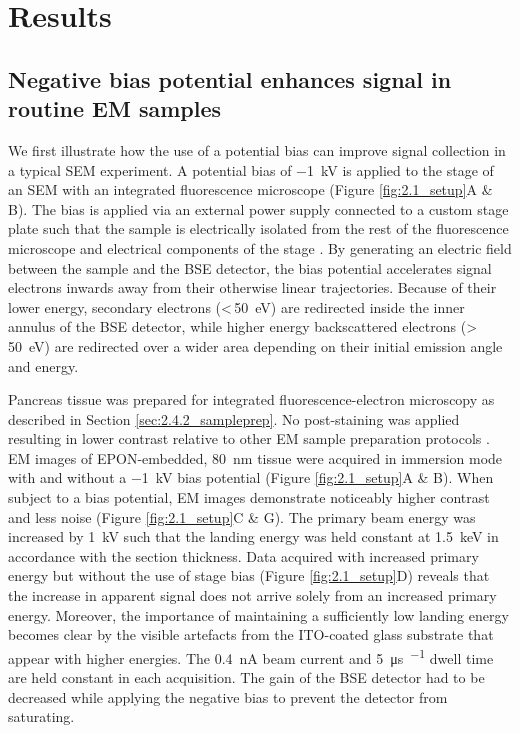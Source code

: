 \section{Results}
\label{sec:2.2_results}

\subsection{Negative bias potential enhances signal in routine EM samples}

We first illustrate how the use of a potential bias can improve signal collection in a typical SEM experiment. A potential bias of \SI{-1}{\kilo\volt} is applied to the stage of an SEM with an integrated fluorescence microscope (Figure \ref{fig:2.1_setup}A \& B). The bias is applied via an external power supply connected to a custom stage plate such that the sample is electrically isolated from the rest of the fluorescence microscope and electrical components of the stage \cite{vos2021retarding}. By generating an electric field between the sample and the BSE detector, the bias potential accelerates signal electrons inwards away from their otherwise linear trajectories. Because of their lower energy, secondary electrons (<\,\SI{50}{\electronvolt}) are redirected inside the inner annulus of the BSE detector, while higher energy backscattered electrons (>\,\SI{50}{\electronvolt}) are redirected over a wider area depending on their initial emission angle and energy.

Pancreas tissue was prepared for integrated fluorescence-electron microscopy as described in Section \ref{sec:2.4.2_sampleprep}. No post-staining was applied resulting in lower contrast relative to other EM sample preparation protocols \cite{kuipers2015scanning}. EM images of EPON-embedded, \SI{80}{\nano\meter} tissue were acquired in immersion mode with and without a \SI{-1}{\kilo\volt} bias potential (Figure \ref{fig:2.1_setup}A \& B). When subject to a bias potential, EM images demonstrate noticeably higher contrast and less noise (Figure \ref{fig:2.1_setup}C \& G). The primary beam energy was increased by \SI{1}{\kilo\volt} such that the landing energy was held constant at \SI{1.5}{\kilo\electronvolt} in accordance with the section thickness. Data acquired with increased primary energy but without the use of stage bias (Figure \ref{fig:2.1_setup}D) reveals that the increase in apparent signal does not arrive solely from an increased primary energy. Moreover, the importance of maintaining a sufficiently low landing energy becomes clear by the visible artefacts from the ITO-coated glass substrate that appear with higher energies. The \SI{0.4}{\nano\ampere} beam current and \SI{5}{\micro\second\per\pixel} dwell time are held constant in each acquisition. The gain of the BSE detector had to be decreased while applying the negative bias to prevent the detector from saturating.

